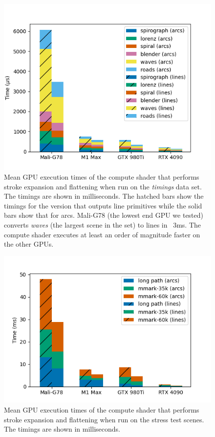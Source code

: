 \documentclass[sigconf, authordraft]{acmart}
\begin{document}
\begin{figure}
    \includegraphics[scale=0.69]{nehab_gpu_timings}
    \caption{Mean GPU execution times of the compute shader that performs stroke expansion and flattening when run on the \citet{Nehab2020} \emph{timings} data set. The timings are shown in milliseconds. The hatched bars show the timings for the version that outputs line primitives while the solid bars show that for arcs. Mali-G78 (the lowest end GPU we tested) converts \emph{waves} (the largest scene in the set) to lines in ~3ms. The compute shader executes at least an order of magnitude faster on the other GPUs.}
    \label{fig:nehab-gpu-timings}
\end{figure}

\begin{figure}
    \includegraphics[scale=0.73]{test_scenes_gpu_timings}
    \caption{Mean GPU execution times of the compute shader that performs stroke expansion and flattening when run on the stress test scenes. The timings are shown in milliseconds.}
    \label{fig:test-scenes-gpu-timings}
\end{figure}
\end{document}
